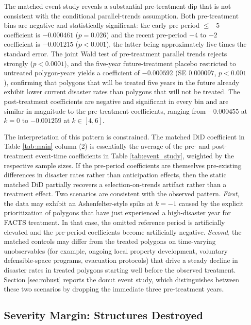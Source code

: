 \documentclass[12pt, letterpaper]{article}
\begin{document}
The matched event study reveals a substantial pre-treatment dip that is not consistent with the conditional parallel-trends assumption. Both pre-treatment bins are negative and statistically significant: the early pre-period $\leq -5$ coefficient is $-0.000461$ ($p = 0.026$) and the recent pre-period $-4$ to $-2$ coefficient is $-0.001215$ ($p < 0.001$), the latter being approximately five times the standard error. The joint Wald test of pre-treatment parallel trends rejects strongly ($p < 0.0001$), and the five-year future-treatment placebo restricted to untreated polygon-years yields a coefficient of $-0.000592$ (SE $0.000097$, $p < 0.001$), confirming that polygons that will be treated five years in the future already exhibit lower current disaster rates than polygons that will not be treated. The post-treatment coefficients are negative and significant in every bin and are similar in magnitude to the pre-treatment coefficients, ranging from $-0.000455$ at $k = 0$ to $-0.001259$ at $k \in [4, 6]$.

The interpretation of this pattern is constrained. The matched DiD coefficient in Table \ref{tab:main} column (2) is essentially the average of the pre- and post-treatment event-time coefficients in Table \ref{tab:event_study}, weighted by the respective sample sizes. If the pre-period coefficients are themselves pre-existing differences in disaster rates rather than anticipation effects, then the static matched DiD partially recovers a selection-on-trends artifact rather than a treatment effect. Two scenarios are consistent with the observed pattern. \textit{First}, the data may exhibit an Ashenfelter-style spike at $k = -1$ caused by the explicit prioritization of polygons that have just experienced a high-disaster year for FACTS treatment. In that case, the omitted reference period is artificially elevated and the pre-period coefficients become artificially negative. \textit{Second}, the matched controls may differ from the treated polygons on time-varying unobservables (for example, ongoing local property development, voluntary defensible-space programs, evacuation protocols) that drive a steady decline in disaster rates in treated polygons starting well before the observed treatment. Section \ref{sec:robust} reports the donut event study, which distinguishes between these two scenarios by dropping the immediate three pre-treatment years.

\subsection{Severity Margin: Structures Destroyed}
\end{document}

